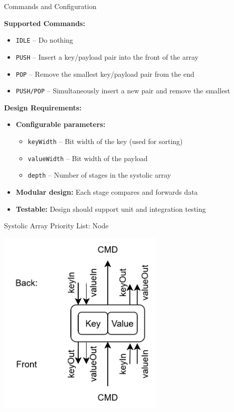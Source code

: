 \begin{frame}{Commands and Configuration}
	
	\textbf{Supported Commands:}
	\begin{itemize}
		\item \texttt{IDLE} – Do nothing
		\item \texttt{PUSH} – Insert a key/payload pair into the front of the array
		\item \texttt{POP} – Remove the smallest key/payload pair from the end
		\item \texttt{PUSH/POP} – Simultaneously insert a new pair and remove the smallest
	\end{itemize}
	
	\pause
	\vspace{0.5em}
	\textbf{Design Requirements:}
	\begin{itemize}
		\item \textbf{Configurable parameters:}
		\begin{itemize}
			\item \texttt{keyWidth} – Bit width of the key (used for sorting)
			\item \texttt{valueWidth} – Bit width of the payload
			\item \texttt{depth} – Number of stages in the systolic array
		\end{itemize}
		\item \textbf{Modular design:} Each stage compares and forwards data
		\item \textbf{Testable:} Design should support unit and integration testing
	\end{itemize}
	
\end{frame}

\begin{frame}{Systolic Array Priority List: Node}
	\centering
	
	\begin{center}
		\includegraphics[width=0.6\textwidth]{images/systolic node.png}
	\end{center}
\end{frame}

